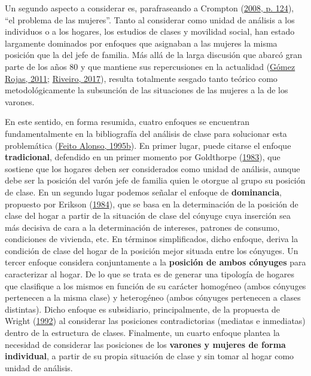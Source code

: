 \documentclass[
]{article}
\begin{document}
Un segundo aspecto a considerar es, parafraseando a Crompton (\protect\hyperlink{ref-Crompton2008}{2008, p. 124}), ``el problema de las mujeres''. Tanto al considerar como unidad de análisis a los individuos o a los hogares, los estudios de clases y movilidad social, han estado largamente dominados por enfoques que asignaban a las mujeres la misma posición que la del jefe de familia. Más allá de la larga discusión que abarcó gran parte de los años 80 y que mantiene sus repercusiones en la actualidad (\protect\hyperlink{ref-GomezRojas2011}{Gómez Rojas, 2011}; \protect\hyperlink{ref-Riveiro2017}{Riveiro, 2017}), resulta totalmente sesgado tanto teórico como metodológicamente la subsunción de las situaciones de las mujeres a la de los varones.

En este sentido, en forma resumida, cuatro enfoques se encuentran fundamentalmente en la bibliografía del análisis de clase para solucionar esta problemática (\protect\hyperlink{ref-FeitoAlonso1995b}{Feito Alonso, 1995b}). En primer lugar, puede citarse el enfoque \textbf{tradicional}, defendido en un primer momento por Goldthorpe (\protect\hyperlink{ref-Goldthorpe1983}{1983}), que sostiene que los hogares deben ser considerados como unidad de análisis, aunque debe ser la posición del varón jefe de familia quien le otorgue al grupo su posición de clase. En un segundo lugar podemos señalar el enfoque de \textbf{dominancia}, propuesto por Erikson (\protect\hyperlink{ref-Erikson1984}{1984}), que se basa en la determinación de la posición de clase del hogar a partir de la situación de clase del cónyuge cuya inserción sea más decisiva de cara a la determinación de intereses, patrones de consumo, condiciones de vivienda, etc. En términos simplificados, dicho enfoque, deriva la condición de clase del hogar de la posición mejor situada entre los cónyuges. Un tercer enfoque considera conjuntamente a la \textbf{posición de ambos cónyuges} para caracterizar al hogar. De lo que se trata es de generar una tipología de hogares que clasifique a los mismos en función de su carácter homogéneo (ambos cónyuges pertenecen a la misma clase) y heterogéneo (ambos cónyuges pertenecen a clases distintas). Dicho enfoque es subsidiario, principalmente, de la propuesta de Wright (\protect\hyperlink{ref-Wright1992}{1992}) al considerar las posiciones contradictorias (mediatas e inmediatas) dentro de la estructura de clases. Finalmente, un cuarto enfoque plantea la necesidad de considerar las posiciones de los \textbf{varones y mujeres de forma individual}, a partir de su propia situación de clase y sin tomar al hogar como unidad de análisis.
\end{document}
